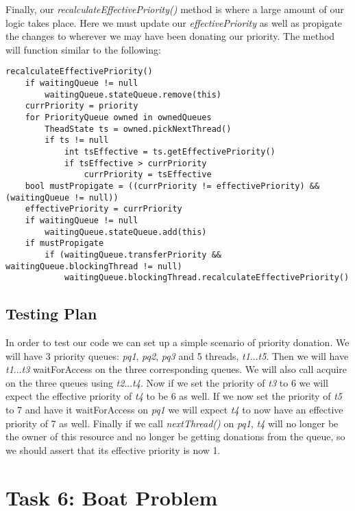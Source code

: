\documentclass{article}
\begin{document}
Finally, our \textit{recalculateEffectivePriority()} method is where a large amount of our logic takes place. Here we
must update our \textit{effectivePriority} as well as propigate the changes to wherever we may have been donating our
priority. The method will function similar to the following:
\begin{lstlisting}
recalculateEffectivePriority()
    if waitingQueue != null
        waitingQueue.stateQueue.remove(this)
    currPriority = priority
    for PriorityQueue owned in ownedQueues
        TheadState ts = owned.pickNextThread()
        if ts != null
            int tsEffective = ts.getEffectivePriority()
            if tsEffective > currPriority
                currPriority = tsEffective
    bool mustPropigate = ((currPriority != effectivePriority) && (waitingQueue != null))
    effectivePriority = currPriority
    if waitingQueue != null
        waitingQueue.stateQueue.add(this)
    if mustPropigate
        if (waitingQueue.transferPriority && waitingQueue.blockingThread != null)
            waitingQueue.blockingThread.recalculateEffectivePriority()
\end{lstlisting}

\subsection*{Testing Plan}

In order to test our code we can set up a simple scenario of priority donation. We will have 3 priority queues:
\textit{pq1}, \textit{pq2}, \textit{pq3} and 5 threads, \textit{t1}...\textit{t5}. Then we will have
\textit{t1}...\textit{t3} waitForAccess on the three corresponding queues. We will also call acquire on the three
queues using \textit{t2}...\textit{t4}. Now if we set the priority of \textit{t3} to 6 we will expect the effective
priority of \textit{t4} to be 6 as well. If we now set the priority of \textit{t5} to 7 and have it waitForAccess on
\textit{pq1} we will expect \textit{t4} to now have an effective priority of 7 as well. Finally if we call
\textit{nextThread()} on \textit{pq1}, \textit{t4} will no longer be the owner of this resource and no longer be getting
donations from the queue, so we should assert that its effective priority is now 1.

\section*{Task 6: Boat Problem}
\end{document}

